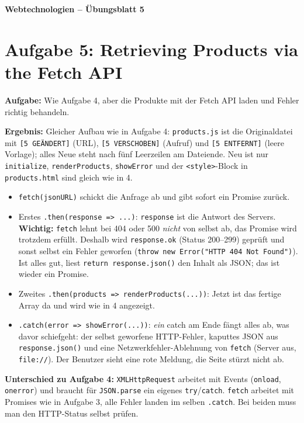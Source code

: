 \documentclass[11pt,a4paper]{article}
\begin{document}
\begin{center}
  {\Large\textbf{Webtechnologien -- Übungsblatt 5}}
\end{center}
\section*{Aufgabe 5: Retrieving Products via the Fetch API}
\textbf{Aufgabe:} Wie Aufgabe 4, aber die Produkte mit der Fetch API
laden und Fehler richtig behandeln.

\medskip
\textbf{Ergebnis:} Gleicher Aufbau wie in Aufgabe 4: \texttt{products.js}
ist die Originaldatei mit \texttt{[5 GEÄNDERT]} (URL),
\texttt{[5 VERSCHOBEN]} (Aufruf) und \texttt{[5 ENTFERNT]} (leere
Vorlage); alles Neue steht nach fünf Leerzeilen am Dateiende. Neu ist nur
\texttt{initialize}, \texttt{renderProducts}, \texttt{showError} und der
\texttt{<style>}-Block in \texttt{products.html} sind gleich wie in 4.
\begin{itemize}
  \item \texttt{fetch(jsonURL)} schickt die Anfrage ab und gibt sofort
    ein Promise zurück.
  \item Erstes \texttt{.then(response => ...)}: \texttt{response} ist die
    Antwort des Servers. \textbf{Wichtig:} \texttt{fetch} lehnt bei
    404 oder 500 \emph{nicht} von selbst ab, das Promise wird trotzdem
    erfüllt. Deshalb wird \texttt{response.ok} (Status 200--299) geprüft
    und sonst selbst ein Fehler geworfen
    (\texttt{throw new Error("HTTP 404 Not Found")}). Ist alles gut,
    liest \texttt{return response.json()} den Inhalt als JSON; das ist
    wieder ein Promise.
  \item Zweites \texttt{.then(products => renderProducts(...))}: Jetzt
    ist das fertige Array da und wird wie in 4 angezeigt.
  \item \texttt{.catch(error => showError(...))}: \emph{ein} catch am
    Ende fängt alles ab, was davor schiefgeht: der selbst geworfene
    HTTP-Fehler, kaputtes JSON aus \texttt{response.json()} und eine
    Netzwerkfehler-Ablehnung von \texttt{fetch} (Server aus,
    \texttt{file://}). Der Benutzer sieht eine rote Meldung, die Seite
    stürzt nicht ab.
\end{itemize}

\textbf{Unterschied zu Aufgabe 4:} \texttt{XMLHttpRequest} arbeitet mit
Events (\texttt{onload}, \texttt{onerror}) und braucht für
\texttt{JSON.parse} ein eigenes \texttt{try}/\texttt{catch}.
\texttt{fetch} arbeitet mit Promises wie in Aufgabe 3, alle Fehler landen
im selben \texttt{.catch}. Bei beiden muss man den HTTP-Status selbst
prüfen.
\end{document}
